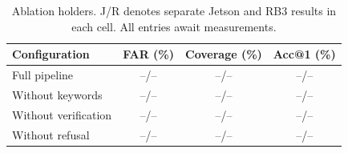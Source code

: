 \begin{table}[t]
\caption{Ablation holders. J/R denotes separate Jetson and RB3 results in each cell. All entries await measurements.}
\label{tab:ablation}\centering\scriptsize
\begin{tabularx}{\columnwidth}{@{}Yccc@{}}\toprule
Configuration & FAR (\%) & Coverage (\%) & Acc@1 (\%)\\\midrule
Full pipeline & --/-- & --/-- & --/--\\
Without keywords & --/-- & --/-- & --/--\\
Without verification & --/-- & --/-- & --/--\\
Without refusal & --/-- & --/-- & --/--\\\bottomrule
\end{tabularx}
\end{table}
